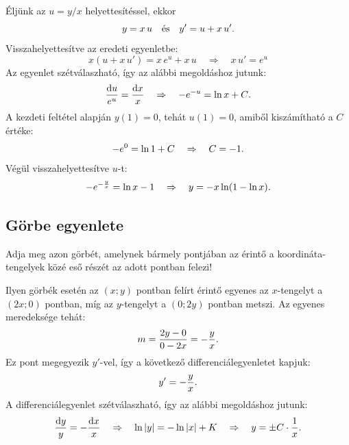 \documentclass{szb-solution}
\begin{document}
\begin{enumerate}[a)]
        Éljünk az $u = y / x$ helyettesítéssel, ekkor
        $$
          y = x \, u
          \quad \text{és} \quad
          y' = u + x \, u'
          \text.
        $$
        Visszahelyettesítve az eredeti egyenletbe:
        $$
          x (u + x \, u') = x \, e^u + x \, u
          \quad \Rightarrow \quad
          x \, u' = e^u
        $$
        Az egyenlet szétválaszható, így az alábbi megoldáshoz jutunk:
        $$
          \frac{\mathop{}\!\mathrm{d} u}{e^u} = \frac{\mathop{}\!\mathrm{d} x}{x}
          \quad \Rightarrow \quad
          -e^{-u} = \ln x + C
          \text.
        $$
        A kezdeti feltétel alapján $y(1) = 0$, tehát $u(1) = 0$, amiből
        kiszámítható a $C$ értéke:
        $$
          -e^{0} = \ln 1 + C
          \quad \Rightarrow \quad
          C = -1
          \text.
        $$
        Végül visszahelyettesítve $u$-t:
        $$
          -e^{-\frac{y}{x}} = \ln x - 1
          \quad \Rightarrow \quad
          y = -x \ln(1 - \ln x)
          \text.
        $$
\end{enumerate}



\subsection{Görbe egyenlete}

Adja meg azon görbét, amelynek bármely pontjában az érintő a
koordináta-ten\-ge\-lyek közé eső részét az adott pontban felezi!

Ilyen görbék esetén az $(x; y)$ pontban felírt érintő egyenes az $x$-tengelyt
a $(2x; 0)$ pontban, míg az $y$-tengelyt a $(0; 2y)$ pontban metszi. Az
egyenes meredeksége tehát:
$$
  m = \frac{2y - 0}{0 - 2x} = -\frac{y}{x}
  \text.
$$
Ez pont megegyezik $y'$-vel, így a következő differenciálegyenletet kapjuk:
$$
  y' = -\frac{y}{x}
  \text.
$$
A differenciálegyenlet szétválaszható, így az alábbi megoldáshoz jutunk:
$$
  \frac{\mathop{}\!\mathrm{d} y}{y} = -\frac{\mathop{}\!\mathrm{d} x}{x}
  \quad \Rightarrow \quad
  \ln |y| = -\ln |x| + K
  \quad \Rightarrow \quad
  y = \pm C \cdot \frac{1}{x}
  \text.
$$


\end{document}
